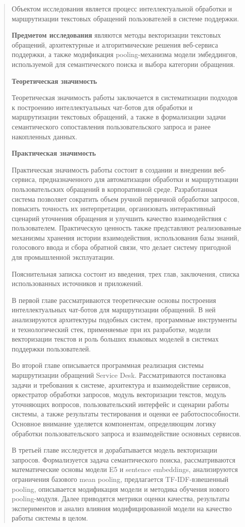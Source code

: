 \begin{quote}
Объектом исследования является процесс интеллектуальной обработки и
маршрутизации текстовых обращений пользователей в системе поддержки.

\textbf{Предметом исследования} являются методы векторизации текстовых
обращений, архитектурные и алгоритмические решения веб-сервиса
поддержки, а также модификация pooling-механизма модели эмбеддингов,
используемой для семантического поиска и выбора категории обращения.

\textbf{Теоретическая значимость}

Теоретическая значимость работы заключается в систематизации подходов к
построению интеллектуальных чат-ботов для обработки и маршрутизации
текстовых обращений, а также в формализации задачи семантического
сопоставления пользовательского запроса и ранее накопленных данных.

\textbf{Практическая значимость}

Практическая значимость работы состоит в создании и внедрении
веб-сервиса, предназначенного для автоматизации обработки и
маршрутизации пользовательских обращений в корпоративной среде.
Разработанная система позволяет сократить объем ручной первичной
обработки запросов, повысить точность их интерпретации, организовать
интерактивный сценарий уточнения обращения и улучшить качество
взаимодействия с пользователем. Практическую ценность также представляют
реализованные механизмы хранения истории взаимодействия, использования
базы знаний, голосового ввода и сбора обратной связи, что делает систему
пригодной для промышленной эксплуатации.

Пояснительная записка состоит из введения, трех глав, заключения, списка
использованных источников и приложений.

В первой главе рассматриваются теоретические основы построения
интеллектуальных чат-ботов для маршрутизации обращений. В ней
анализируются архитектуры подобных систем, программные инструменты и
технологический стек, применяемые при их разработке, модели векторизации
текстов и роль больших языковых моделей в системах поддержки
пользователей.

Во второй главе описывается программная реализация системы маршрутизации
обращений Service Desk. Рассматриваются постановка задачи и требования к
системе, архитектура и взаимодействие сервисов, оркестратор обработки
запросов, модуль векторизации текстов, модуль уточняющих вопросов,
пользовательский интерфейс и сценарии работы системы, а также результаты
тестирования и оценки ее работоспособности. Основное внимание уделяется
компонентам, определяющим логику обработки пользовательского запроса и
взаимодействие основных сервисов.

В третьей главе исследуется и дорабатывается модель векторизации
запросов. Формализуется задача семантического поиска, рассматриваются
математические основы модели E5 и sentence embeddings, анализируются
ограничения базового mean pooling, предлагается TF-IDF-взвешенный
pooling, описывается модификация модели и методика обучения нового
pooling-модуля. Далее приводятся метрики оценки качества, результаты
экспериментов и анализ влияния модифицированной модели на качество
работы системы в целом.
\end{quote}

